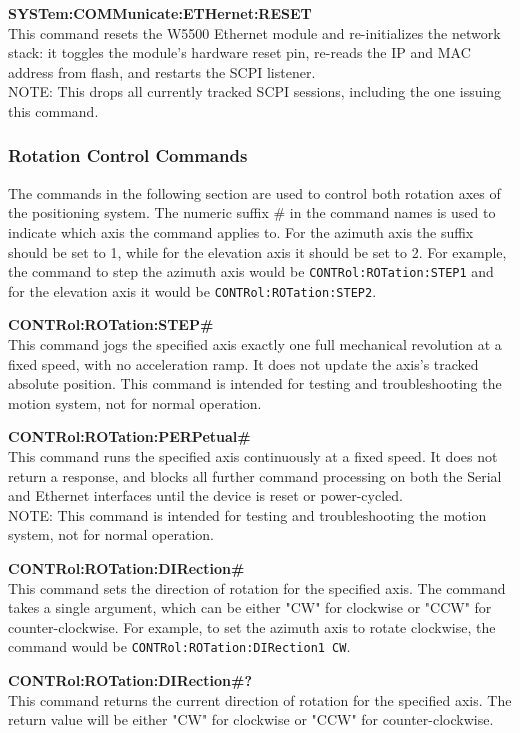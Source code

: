 \textbf{SYSTem:COMMunicate:ETHernet:RESET} \\
This command resets the W5500 Ethernet module and re-initializes the network stack: it toggles the module's hardware reset pin, re-reads the IP and MAC address from flash, and restarts the SCPI listener. \\
NOTE: This drops all currently tracked SCPI sessions, including the one issuing this command.

\subsubsection{Rotation Control Commands}

The commands in the following section are used to control both rotation axes of the positioning system. The numeric suffix \# in the command names is used to indicate which axis the command applies to. For the azimuth axis the suffix should be set to 1, while for the elevation axis it should be set to 2. For example, the command to step the azimuth axis would be \texttt{CONTRol:ROTation:STEP1} and for the elevation axis it would be \texttt{CONTRol:ROTation:STEP2}.
\vspace{1em}

\textbf{CONTRol:ROTation:STEP\#} \\
This command jogs the specified axis exactly one full mechanical revolution at a fixed speed, with no acceleration ramp. It does not update the axis's tracked absolute position. This command is intended for testing and troubleshooting the motion system, not for normal operation.

\textbf{CONTRol:ROTation:PERPetual\#} \\
This command runs the specified axis continuously at a fixed speed. It does not return a response, and blocks all further command processing on both the Serial and Ethernet interfaces until the device is reset or power-cycled. \\
NOTE: This command is intended for testing and troubleshooting the motion system, not for normal operation.

\textbf{CONTRol:ROTation:DIRection\#} \\
This command sets the direction of rotation for the specified axis. The command takes a single argument, which can be either "CW" for clockwise or "CCW" for counter-clockwise. For example, to set the azimuth axis to rotate clockwise, the command would be \texttt{CONTRol:ROTation:DIRection1 CW}.

\textbf{CONTRol:ROTation:DIRection\#?} \\
This command returns the current direction of rotation for the specified axis. The return value will be either "CW" for clockwise or "CCW" for counter-clockwise.

